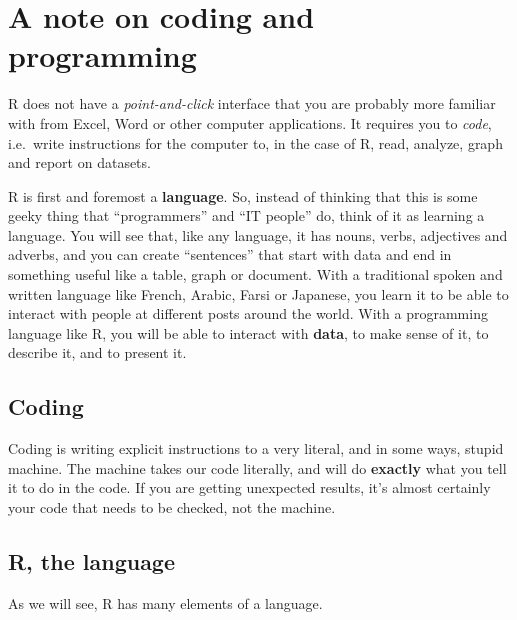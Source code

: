 \documentclass[12pt,letterpaperpaper,openany]{book}
\begin{document}
\hypertarget{a-note-on-coding-and-programming}{%
\section*{A note on coding and programming}\label{a-note-on-coding-and-programming}}

R does not have a \emph{point-and-click} interface that you are probably more familiar with
from Excel, Word or other computer applications. It requires you to \emph{code}, i.e.~write
instructions for the computer to, in the case of R, read, analyze, graph and report on datasets.

R is first and foremost a \textbf{language}. So, instead of thinking that this is some
geeky thing that ``programmers'' and ``IT people'' do, think of it as learning a language.
You will see that, like any language, it has nouns, verbs, adjectives and adverbs,
and you can create ``sentences'' that start with data and end in something useful like a
table, graph or document. With a traditional spoken and written language like French, Arabic, Farsi or Japanese, you learn it to
be able to interact with people at different posts around the world. With a programming language
like R, you will be able to interact with \textbf{data}, to make sense of it, to describe it,
and to present it.

\hypertarget{coding}{%
\subsection*{Coding}\label{coding}}

Coding is writing explicit instructions to a very literal, and in some ways, stupid machine.
The machine takes our code literally, and will do \textbf{exactly} what you tell it to do in the code. If
you are getting unexpected results, it's almost certainly your code that needs to be checked, not
the machine.

\hypertarget{r-the-language}{%
\subsection*{R, the language}\label{r-the-language}}

As we will see, R has many elements of a language.
\end{document}
